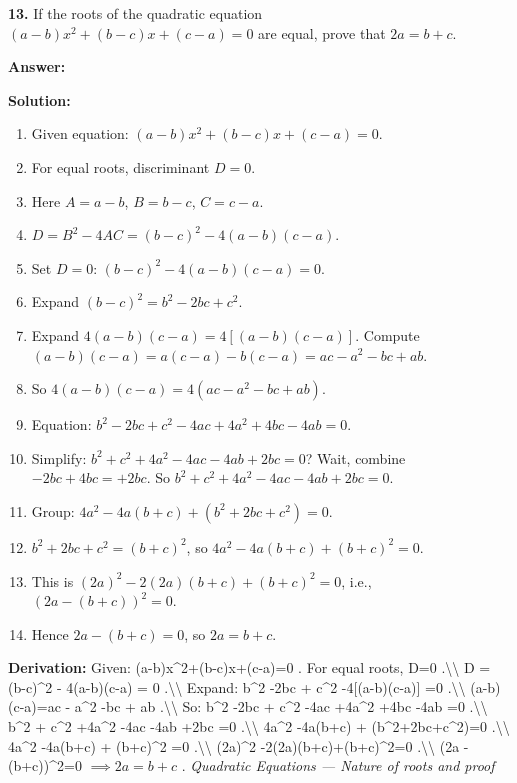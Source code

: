 \documentclass[12pt,a4paper]{exam}
\newcommand{\fitmath}[1]{%
  \sbox{\schmathbox}{$\displaystyle #1$}%
  \ifdim\wd\schmathbox>\linewidth
    \resizebox{\linewidth}{!}{\usebox{\schmathbox}}%
  \else
    \usebox{\schmathbox}%
  \fi}
\begin{document}
\begin{questions}
\question \textbf{13.} If the roots of the quadratic equation $(a-b)x^2 + (b-c)x + (c-a) = 0$ are equal, prove that $2a = b + c$.

\textbf{Answer:}
\begin{center}
\fitmath{\text{Proved}: 2a = b + c.}
\end{center}

\textbf{Solution:}
\begin{enumerate}
  \item Given equation: $(a-b)x^2 + (b-c)x + (c-a) = 0$.
  \item For equal roots, discriminant $D = 0$.
  \item Here $A = a-b$, $B = b-c$, $C = c-a$.
  \item $D = B^2 - 4AC = (b-c)^2 - 4(a-b)(c-a)$.
  \item Set $D = 0$: $(b-c)^2 - 4(a-b)(c-a) = 0$.
  \item Expand $(b-c)^2 = b^2 - 2bc + c^2$.
  \item Expand $4(a-b)(c-a) = 4[(a-b)(c-a)]$. Compute $(a-b)(c-a) = a(c-a) - b(c-a) = ac - a^2 - bc + ab$.
  \item So $4(a-b)(c-a) = 4(ac - a^2 - bc + ab)$.
  \item Equation: $b^2 - 2bc + c^2 - 4ac + 4a^2 + 4bc - 4ab = 0$.
  \item Simplify: $b^2 + c^2 + 4a^2 - 4ac - 4ab + 2bc = 0$? Wait, combine $-2bc + 4bc = +2bc$. So $b^2 + c^2 + 4a^2 - 4ac - 4ab + 2bc = 0$.
  \item Group: $4a^2 - 4a(b+c) + (b^2 + 2bc + c^2) = 0$.
  \item $b^2 + 2bc + c^2 = (b+c)^2$, so $4a^2 - 4a(b+c) + (b+c)^2 = 0$.
  \item This is $(2a)^2 - 2(2a)(b+c) + (b+c)^2 = 0$, i.e., $(2a - (b+c))^2 = 0$.
  \item Hence $2a - (b+c) = 0$, so $2a = b + c$.
\end{enumerate}
\textbf{Derivation:}
Given:  (a-b)x\textasciicircum{}2+(b-c)x+(c-a)=0 . For equal roots,  D=0 .\textbackslash{}\textbackslash{}  D = (b-c)\textasciicircum{}2 - 4(a-b)(c-a) = 0 .\textbackslash{}\textbackslash{} Expand:  b\textasciicircum{}2 -2bc + c\textasciicircum{}2 -4[(a-b)(c-a)] =0 .\textbackslash{}\textbackslash{}  (a-b)(c-a)=ac - a\textasciicircum{}2 -bc + ab .\textbackslash{}\textbackslash{} So:  b\textasciicircum{}2 -2bc + c\textasciicircum{}2 -4ac +4a\textasciicircum{}2 +4bc -4ab =0 .\textbackslash{}\textbackslash{}  b\textasciicircum{}2 + c\textasciicircum{}2 +4a\textasciicircum{}2 -4ac -4ab +2bc =0 .\textbackslash{}\textbackslash{}  4a\textasciicircum{}2 -4a(b+c) + (b\textasciicircum{}2+2bc+c\textasciicircum{}2)=0 .\textbackslash{}\textbackslash{}  4a\textasciicircum{}2 -4a(b+c) + (b+c)\textasciicircum{}2 =0 .\textbackslash{}\textbackslash{}  (2a)\textasciicircum{}2 -2(2a)(b+c)+(b+c)\textasciicircum{}2=0 .\textbackslash{}\textbackslash{}  (2a - (b+c))\textasciicircum{}2=0 $\implies 2a = b+c$ .
\hfill \textit{Quadratic Equations — Nature of roots and proof}
\vspace{0.3cm}


\end{questions}
\end{document}

